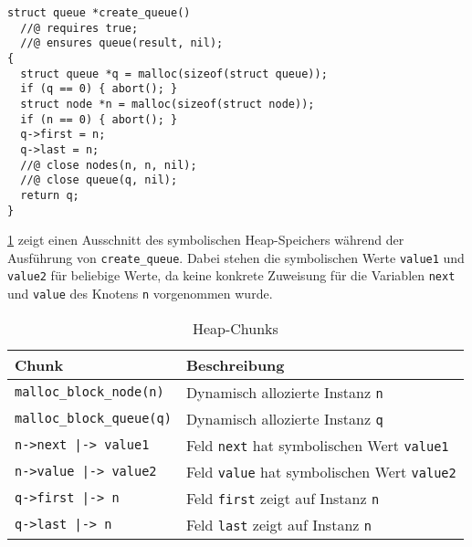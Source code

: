 \begin{lstlisting}
struct queue *create_queue()
  //@ requires true;
  //@ ensures queue(result, nil);
{
  struct queue *q = malloc(sizeof(struct queue));
  if (q == 0) { abort(); }
  struct node *n = malloc(sizeof(struct node));
  if (n == 0) { abort(); }
  q->first = n;
  q->last = n;
  //@ close nodes(n, n, nil);
  //@ close queue(q, nil);
  return q;
}
\end{lstlisting}

\noindent
\cref{tab:heap-chunks} zeigt einen Ausschnitt des symbolischen Heap-Speichers während der Ausführung von \texttt{create\_queue}. Dabei stehen die symbolischen Werte \texttt{value1} und \texttt{value2} für beliebige Werte, da keine konkrete Zuweisung für die Variablen \texttt{next} und \texttt{value} des Knotens \texttt{n} vorgenommen wurde.

{\setlength\extrarowheight{5pt} %
\begin{table}[hbt!]
	\caption{Heap-Chunks}
	\begin{tabularx}{\textwidth}{|p{4.5cm}|X|}
		\hline
		\rowcolor{LightGrey1}
		\textbf{Chunk}                   & \textbf{Beschreibung}                                     \\ \hline
		\texttt{malloc\_block\_node(n)}  & Dynamisch allozierte Instanz \texttt{n}                   \\ \hline
		\texttt{malloc\_block\_queue(q)} & Dynamisch allozierte Instanz \texttt{q}                   \\ \hline
		\texttt{n->next |-> value1}      & Feld \texttt{next} hat symbolischen Wert \texttt{value1}  \\ \hline
		\texttt{n->value |-> value2}     & Feld \texttt{value} hat symbolischen Wert \texttt{value2} \\ \hline
		\texttt{q->first |-> n}          & Feld \texttt{first} zeigt auf Instanz \texttt{n}          \\ \hline
		\texttt{q->last |-> n}           & Feld \texttt{last} zeigt auf Instanz \texttt{n}           \\ \hline
	\end{tabularx}
	\label{tab:heap-chunks}
\end{table}
}

